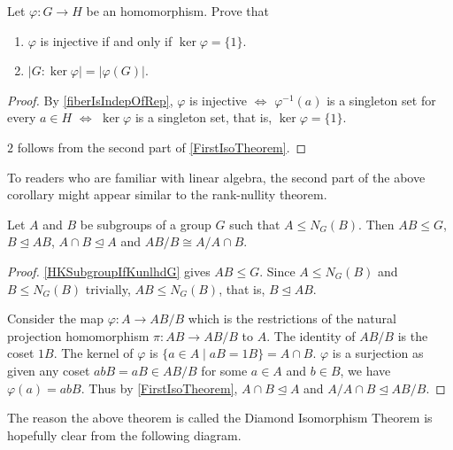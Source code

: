 \begin{corollary}
    Let $\varphi:G\to H$ be an homomorphism. Prove that
    \begin{enumerate}
        \item $\varphi$ is injective if and only if $\ker\varphi=\{1\}$.
        \item $|G:\ker\varphi|=|\varphi(G)|$.
    \end{enumerate}
\end{corollary}
\begin{proof}
    By \ref{fiberIsIndepOfRep}, $\varphi$ is injective $\iff$ $\varphi^{-1}(a)$ is a singleton set for every $a\in H$ $\iff$ $\ker\varphi$ is a singleton set, that is, $\ker\varphi=\{1\}$.
    
    $2$ follows from the second part of \ref{FirstIsoTheorem}.
\end{proof}

To readers who are familiar with linear algebra, the second part of the above corollary might appear similar to the rank-nullity theorem.

\begin{theorem}
\label{SecondIsoTheorem}
    Let $A$ and $B$ be subgroups of a group $G$ such that $A\leq N_G(B)$. Then $AB\leq G$, $B\unlhd AB$, $A\cap B\unlhd A$ and $AB/B\cong A/A\cap B$.
\end{theorem}
\begin{proof}
    \ref{HKSubgroupIfKunlhdG} gives $AB\leq G$. Since $A\leq N_G(B)$ and $B\leq N_G(B)$ trivially, $AB\leq N_G(B)$, that is, $B\unlhd AB$.
    
    Consider the map $\varphi:A\to AB/B$ which is the restrictions of the natural projection homomorphism $\pi:AB\to AB/B$ to $A$. The identity of $AB/B$ is the coset $1B$. The kernel of $\varphi$ is $\{a\in A\mid aB=1B\}=A\cap B$. $\varphi$ is a surjection as given any coset $abB=aB\in AB/B$ for some $a\in A$ and $b\in B$, we have $\varphi(a)=abB$. Thus by \ref{FirstIsoTheorem}, $A\cap B\unlhd A$ and $A/A\cap B\unlhd AB/B$.
\end{proof}

The reason the above theorem is called the Diamond Isomorphism Theorem is hopefully clear from the following diagram.

\begin{center}
\end{center}

